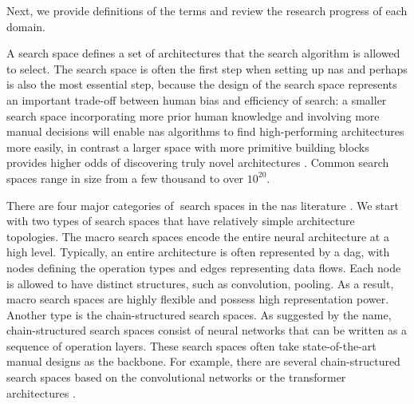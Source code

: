 \noindent Next, we provide definitions of the terms and review the research progress of each domain.
\begin{description}[leftmargin=0cm, listparindent=\parindent]
	\item [Search Space] A search space defines a set of architectures that the search algorithm is allowed to select. The search space is often the first step when setting up \gls{nas} and perhaps is also the most essential step, because
		the design of the search space represents an important trade-off between human bias and efficiency of search: a
		smaller search space incorporating more prior human knowledge and involving more manual decisions will enable
		\gls{nas} algorithms to find high-performing architectures more easily, in contrast a larger space with more primitive
		building blocks provides higher odds of discovering truly novel architectures \cite{white2023survey}. Common  search
		spaces range in size from a few thousand to over $10^{20}$.	
	
		There are four major categories of search spaces in the \gls{nas} literature \cite{white2023survey}. We start with two types of search spaces that have relatively simple architecture topologies. The macro search spaces \cite{baker2017designing, kandasamy2018neural, zoph2017neural} encode the entire neural architecture at a high level. Typically, an entire architecture is often represented by a \gls{dag}, with nodes defining the operation types and edges representing data flows. Each node is allowed to have distinct structures, such as convolution, pooling. As a result, macro search  spaces are highly flexible and possess high representation power. Another type is the chain-structured search spaces. As suggested by the name, chain-structured search spaces consist of neural networks that can be written as a sequence of operation layers. These search spaces often take state-of-the-art manual designs as the backbone. For example, there are several chain-structured search spaces based on the convolutional networks \cite{cai2018proxylessnas} or the transformer architectures \cite{xu2021nasbert}. 
		

\end{description}
